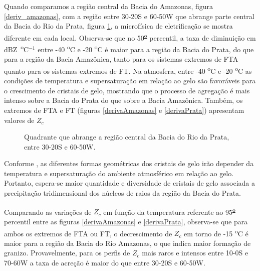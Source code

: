 Quando comparamos a região central da Bacia do Amazonas, figura \ref{deriv_amazonas}, com a região entre 30-20S e 60-50W que abrange parte central da Bacia do Rio da Prata, figura \ref{deriv_prata}, a microfísica de eletrificação se mostra diferente em cada local. Observa-se que no 50\textsuperscript{\underline{o}} percentil, a taxa de diminuição em dBZ~\textsuperscript{o}C$^{-1}$ entre -40 \textsuperscript{o}C e -20 \textsuperscript{o}C é maior para a região da Bacia do Prata, do que para a região da Bacia Amazônica, tanto para os sistemas extremos de FTA quanto para os sistemas extremos de FT. Na atmosfera, entre -40 \textsuperscript{o}C e -20 \textsuperscript{o}C as condições de temperatura e supersaturação em relação ao gelo são favoráveis para o crescimento de cristais de gelo, mostrando que o processo de agregação é mais intenso sobre a Bacia do Prata do que sobre a Bacia Amazônica. Também,  os extremos de FTA e FT (figuras \ref{derivaAmazonas} e \ref{derivaPrata}) apresentam valores de $Z_c$





\begin{figure}[!ht]
\centering
{}
\caption{Quadrante que abrange a região central da Bacia do Rio da Prata, entre 30-20S e 60-50W.}
\label{deriv_prata}
\end{figure}

Conforme , as diferentes formas geométricas dos cristais de gelo irão depender da temperatura e supersaturação do ambiente atmosférico em relação ao gelo. Portanto, espera-se maior quantidade e diversidade de cristais de gelo associada a precipitação tridimensional dos núcleos de raios  da região da Bacia do Prata.

Comparando as variações de $Z_c$ em função da temperatura referente ao 95\textsuperscript{\underline{o}} percentil entre as figuras \ref{derivaAmazonas} e \ref{derivaPrata}, observa-se que para ambos os extremos de FTA ou FT, o decrescimento de $Z_c$ em torno de -15 \textsuperscript{o}C é maior para a região da Bacia do Rio Amazonas, o que indica maior formação de granizo. Provavelmente, para os perfis de $Z_c$ mais raros e intensos entre 10-0S e 70-60W a taxa de acreção é maior do que entre 30-20S e 60-50W. 

